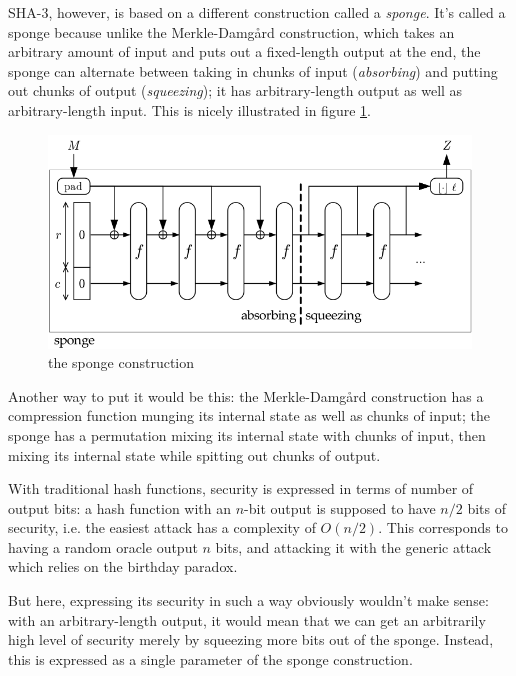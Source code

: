 \documentclass[times, utf8, diplomski]{fer}
\begin{document}
SHA-3, however, is based on a different construction called a \emph{sponge}.
It's called a sponge because unlike the Merkle-Damgård construction, which takes
an arbitrary amount of input and puts out a fixed-length output at the end, the
sponge can alternate between taking in chunks of input (\emph{absorbing}) and
putting out chunks of output (\emph{squeezing}); it has arbitrary-length output
as well as arbitrary-length input.
This is nicely illustrated in figure \ref{fig:sponge}.


\begin{figure}[htb]
    \centering
    \includegraphics{images/sponge.png}
    \caption{the sponge construction}
    \label{fig:sponge}
\end{figure}

Another way to put it would be this: the Merkle-Damgård construction has a
compression function munging its internal state as well as chunks of input;
the sponge has a permutation mixing its internal state with chunks of input,
then mixing its internal state while spitting out chunks of output.

With traditional hash functions, security is expressed in terms of number of
output bits: a hash function with an $n$-bit output is supposed to have $n/2$
bits of security, i.e. the easiest attack has a complexity of $O(n/2)$.
This corresponds to having a random oracle output $n$ bits, and attacking it
with the generic attack which relies on the birthday paradox.

But here, expressing its security in such a way obviously wouldn't make sense:
with an arbitrary-length output, it would mean that we can get an arbitrarily
high level of security merely by squeezing more bits out of the sponge.
Instead, this is expressed as a single parameter of the sponge construction.
\end{document}
